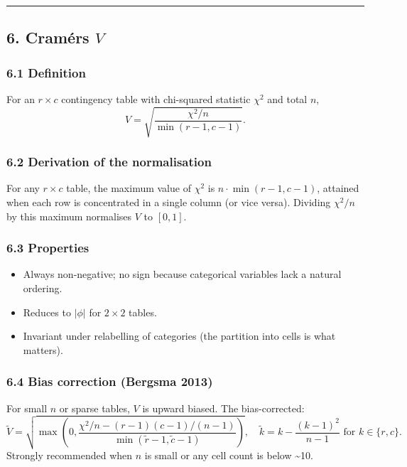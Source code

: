 \documentclass{article}
\providecommand{\tightlist}{\setlength{\itemsep}{0pt}\setlength{\parskip}{0pt}}
\begin{document}
\begin{center}\rule{0.5\linewidth}{0.5pt}\end{center}

\subsection{\texorpdfstring{6. Cramér\textquotesingle s
\(V\)}{6. Cramér\textquotesingle s V}}\label{6-cramuxe9rs-v}

\subsubsection{6.1 Definition}\label{61-definition}

For an \(r \times c\) contingency table with chi-squared statistic
\(\chi^2\) and total \(n\), \[
V = \sqrt{\frac{\chi^2 / n}{\min(r - 1, c - 1)}}.
\]

\subsubsection{6.2 Derivation of the
normalisation}\label{62-derivation-of-the-normalisation}

For any \(r \times c\) table, the maximum value of \(\chi^2\) is
\(n \cdot \min(r-1, c-1)\), attained when each row is concentrated in a
single column (or vice versa). Dividing \(\chi^2/n\) by this maximum
normalises \(V\) to \([0, 1]\).

\subsubsection{6.3 Properties}\label{63-properties}

\begin{itemize}
\tightlist
\item
  Always non-negative; no sign because categorical variables lack a
  natural ordering.
\item
  Reduces to \(|\phi|\) for \(2 \times 2\) tables.
\item
  Invariant under relabelling of categories (the partition into cells is
  what matters).
\end{itemize}

\subsubsection{6.4 Bias correction (Bergsma
2013)}\label{64-bias-correction-bergsma-2013}

For small \(n\) or sparse tables, \(V\) is upward biased. The
bias-corrected: \[
\tilde{V} = \sqrt{\max\!\left(0, \frac{\chi^2/n - (r-1)(c-1)/(n-1)}{\min(\tilde{r}-1, \tilde{c}-1)}\right)}, \quad \tilde{k} = k - \frac{(k-1)^2}{n-1} \text{ for } k \in \{r, c\}.
\] Strongly recommended when \(n\) is small or any cell count is below
\textasciitilde10.
\end{document}
